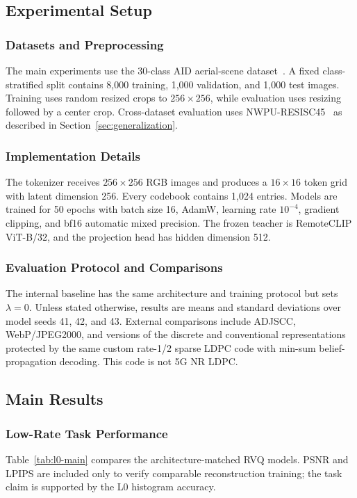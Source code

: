 \documentclass[letterpaper,journal]{IEEEtran}
\begin{document}
\subsection{Experimental Setup}

\subsubsection{Datasets and Preprocessing}
The main experiments use the 30-class AID aerial-scene dataset~\cite{xia2017aid}. A fixed class-stratified split contains 8,000 training, 1,000 validation, and 1,000 test images. Training uses random resized crops to $256\times256$, while evaluation uses resizing followed by a center crop. Cross-dataset evaluation uses NWPU-RESISC45~\cite{cheng2017nwpu} as described in Section~\ref{sec:generalization}.

\subsubsection{Implementation Details}
The tokenizer receives $256\times256$ RGB images and produces a $16\times16$ token grid with latent dimension 256. Every codebook contains 1,024 entries. Models are trained for 50 epochs with batch size 16, AdamW, learning rate $10^{-4}$, gradient clipping, and bf16 automatic mixed precision. The frozen teacher is RemoteCLIP ViT-B/32, and the projection head has hidden dimension 512.

\subsubsection{Evaluation Protocol and Comparisons}
The internal baseline has the same architecture and training protocol but sets $\lambda=0$. Unless stated otherwise, results are means and standard deviations over model seeds 41, 42, and 43. External comparisons include ADJSCC, WebP/JPEG2000, and versions of the discrete and conventional representations protected by the same custom rate-1/2 sparse LDPC code with min-sum belief-propagation decoding. This code is not 5G NR LDPC.

\subsection{Main Results}

\subsubsection{Low-Rate Task Performance}
\label{sec:low-rate}
Table~\ref{tab:l0-main} compares the architecture-matched RVQ models. PSNR and LPIPS are included only to verify comparable reconstruction training; the task claim is supported by the L0 histogram accuracy.
\end{document}
